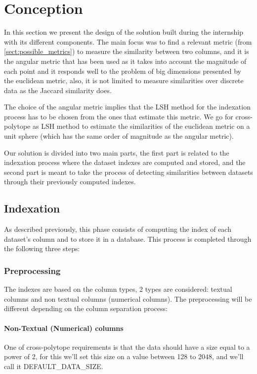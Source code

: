 \chapter{Conception}

In this section we present the design of the solution built during the
internship with its different components. The main focus was to find a relevant
metric (from \ref{sect:possible_metrics}) to measure the similarity between two
columns, and it is the angular metric that has been used as it takes into
account the magnitude of each point and it responds well to the problem of big
dimensions presented by the euclidean metric, also, it is not limited to measure
similarities over discrete data as the Jaccard similarity does.

The choice of the angular metric implies that the LSH method for the indexation
process has to be chosen from the ones that estimate this metric. We go for
cross-polytope as LSH method to estimate the similarities of the euclidean
metric on a unit sphere (which has the same order of magnitude as the angular
metric).

Our solution is divided into two main parts, the first part is related to the
indexation process where the dataset indexes are computed and stored, and the
second part is meant to take the process of detecting similarities between
datasets through their previously computed indexes.


\section{Indexation}
As described previously, this phase consists of computing the index of each
dataset's column and to store it in a database. This process is completed
through the following three steps:

\subsection{Preprocessing}
The indexes are based on the column types, 2 types are considered: textual
columns and non textual columns (numerical columns). The preprocessing will be
different depending on the column separation process:
\subsubsection{Non-Textual (Numerical) columns}
One of cross-polytope requirements is that the data should have a size equal to
a power of 2, for this we'll set this size on a value between 128 to 2048, and
we'll call it \mbox{DEFAULT\_DATA\_SIZE}.


